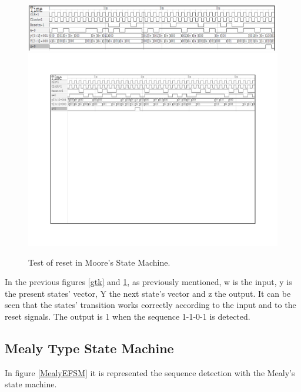 \begin{figure}[H]
\centering
\includegraphics[scale=0.9]{../Exercise2/Moore/gtkr1}\\
\includegraphics[scale=0.9]{../Exercise2/Moore/gtkr2}
\caption{\color{cyan}Test of reset in Moore's State Machine.}
\label{gtkr}
\end{figure}

In the previous figures \ref{gtk} and \ref{gtkr}, as previously mentioned, w is the input, y is the present states' vector, Y the next state's vector and z the output. It can be seen that the states' transition works correctly according to the input and to the reset signals. The output is 1 when the sequence 1-1-0-1 is detected.

\subsection{\color{purple}Mealy Type State Machine}

In figure \ref {MealyEFSM} it is represented the sequence detection with the Mealy's state machine.

